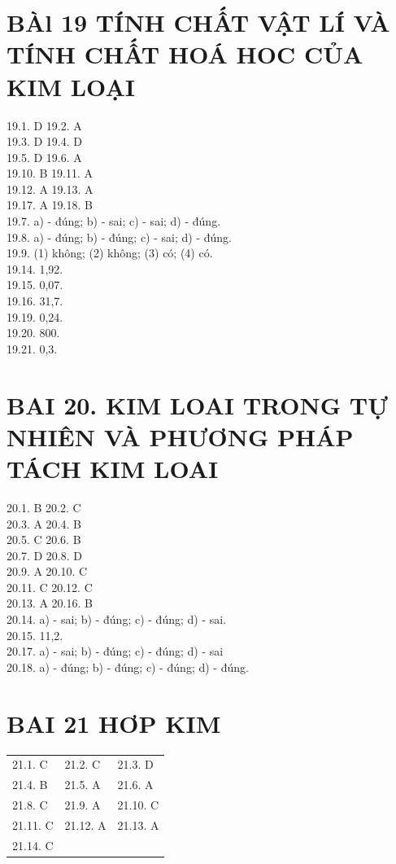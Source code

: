 \documentclass[10pt]{article}
\begin{document}
\section*{BÀl 19 TÍNH CHẤT VẬT LÍ VÀ TÍNH CHẤT HOÁ HOC CỦA KIM LOẠI}
19.1. D 19.2. A\\
19.3. D 19.4. D\\
19.5. D 19.6. A\\
19.10. B 19.11. A\\
19.12. A 19.13. A\\
19.17. A 19.18. B\\
19.7. a) - đúng; b) - sai; c) - sai; d) - đúng.\\
19.8. a) - đúng; b) - đúng; c) - sai; d) - đúng.\\
19.9. (1) không; (2) không; (3) có; (4) có.\\
19.14. 1,92.\\
19.15. 0,07.\\
19.16. 31,7.\\
19.19. 0,24.\\
19.20. 800.\\
19.21. 0,3.

\section*{BAI 20. KIM LOAI TRONG TỰ NHIÊN VÀ PHƯƠNG PHÁP TÁCH KIM LOAI}
20.1. B 20.2. C\\
20.3. A 20.4. B\\
20.5. C 20.6. B\\
20.7. D 20.8. D\\
20.9. A 20.10. C\\
20.11. C 20.12. C\\
20.13. A 20.16. B\\
20.14. a) - sai; b) - đúng; c) - đúng; d) - sai.\\
20.15. 11,2.\\
20.17. a) - sai; b) - đúng; c) - đúng; d) - sai\\
20.18. a) - đúng; b) - đúng; c) - đúng; d) - đúng.

\section*{BAI 21 HƠP KIM}
\begin{center}
\begin{tabular}{lll}
21.1. C & 21.2. C & 21.3. D \\
21.4. B & 21.5. A & 21.6. A \\
21.8. C & 21.9. A & 21.10. C \\
21.11. C & 21.12. A & 21.13. A \\
21.14. C &  &  \\
\end{tabular}
\end{center}
\end{document}
